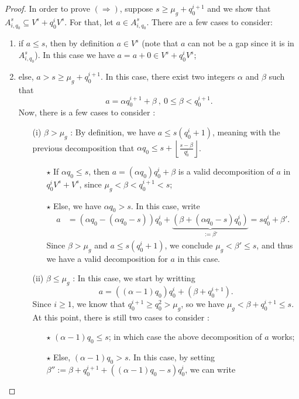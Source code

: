 \documentclass[a4paper]{article}
\begin{document}
\begin{proof}
In order to prove $(\Rightarrow)$, suppose $s \geq \mu_g+q_0^{i+1}$ and we show that $A^s_{i,q_0} \subseteq V^s+q_0^iV^s$. For that, let $a \in A^s_{i,q_0}$. There are a few cases to consider:
\begin{enumerate}
    \item if $a \leq s$, then by definition $a \in V^s$ (note that $a$ can not be a gap since it is in $A^s_{i,q_0}$). In this case we have  $a=a+0 \in V^s+q^i_0V^s$;
    \item else, $a > s \geq \mu_g+q_0^{i+1}$. In this case, there exist two integers $\alpha$ and $\beta$ such that 
     \[ a= \alpha q_0^{i+1} + \beta \ , \ 0 \leq \beta < q_0^{i+1}.\] 
     Now, there is a few cases to consider :
\begin{itemize}
    \item[(i)] \underline{$\beta > \mu_g$} : By definition, we have $a \leq s(q_0^i+1)$, meaning with the previous decomposition that $\alpha q_0 \leq s + \left\lfloor \frac{s-\beta}{q_0^i}\right\rfloor$. 
    \begin{itemize}
        \item[$\star$] If $\alpha q_0 \leq s$, then $a = (\alpha q_0)q_0^i + \beta$ is a valid decomposition of $a$ in $q_0^iV^s + V^s$, since $\mu_g < \beta < q_0^{i+1} < s$;
        \item[$\star$] Else, we have $\alpha q_0 > s$. In this case, write
        \begin{align*}
            a &= (\alpha q_0 - (\alpha q_0 - s))q_0^i + \underbrace{(\beta + (\alpha q_0 -s)q_0^i)}_{:=\beta'} = sq_0^i + \beta'.
        \end{align*}
        Since $\beta > \mu_g$ and $a \leq s(q_0^i+1)$, we conclude $\mu_g < \beta' \leq s$, and thus we have a valid decomposition for $a$ in this case.
    \end{itemize}
    \item[(ii)] \underline{$\beta \leq \mu_g$} : In this case, we start by writting
    \[ a = ((\alpha-1)q_0)q_0^i + (\beta+q_0^{i+1}) .\]
    Since $i\geq 1$, we know that $q_0^{i+1} \geq q_0^2 > \mu_g$, so we have $\mu_g < \beta+q_0^{i+1} \leq s$. At this point, there is still two cases to consider :
    \begin{itemize}
        \item [$\star$] $(\alpha-1)q_0 \leq s$; in which case the above decomposition of $a$ works;
        \item [$\star$] Else, $(\alpha-1)q_0 >s$. In this case, by setting $\beta'':= \beta + q_0^{i+1}+((\alpha-1)q_0-s)q_0^i$, we can write

\end{itemize}
\end{itemize}
\end{enumerate}
\end{proof}
\end{document}

